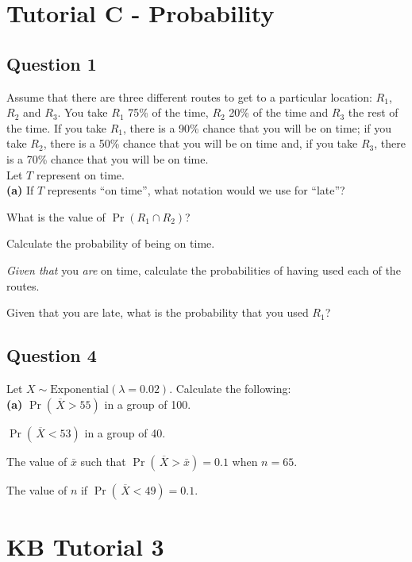 \section{Tutorial C - Probability}	
\subsection*{Question 1}
Assume that there are three different routes to get to a particular location: $R_1$, $R_2$ and $R_3$. You take $R_1$ 75\% of the time, $R_2$ 20\% of the time and $R_3$ the rest of the time. If you take $R_1$, there is a 90\% chance that you will be on time; if you take $R_2$, there is a 50\% chance that you will be on time and, if you take $R_3$, there is a 70\% chance that you will be on time. \\[0.1cm]
Let $T$ represent on time.\\[-0.2cm]

{\bf(a)} If $T$ represents ``on time'', what notation would we use for ``late''? 
 \item  What is the value of $\Pr(R_1 \cap R_2)$? 
 \item  Calculate the probability of being on time. 
 \item  \emph{Given that} you \emph{are} on time, calculate the probabilities of having used each of the routes. 
 \item  Given that you are late, what is the probability that you used $R_1$?









\subsection*{Question 4}
Let $X \sim \text{Exponential}(\lambda=0.02)$. Calculate the following:\\[-0.2cm]

{\bf(a)} $\Pr(\,\overline{\!X} > 55)$ in a group of 100. 
 \item  $\Pr(\,\overline{\!X} < 53)$ in a group of 40. 
 \item  The value of $\bar x$ such that $\Pr(\,\overline{\!X} > \bar x) = 0.1$ when $n=65$. 
 \item  The value of $n$ if $\Pr(\,\overline{\!X} < 49) = 0.1$.



\section{KB Tutorial 3}
